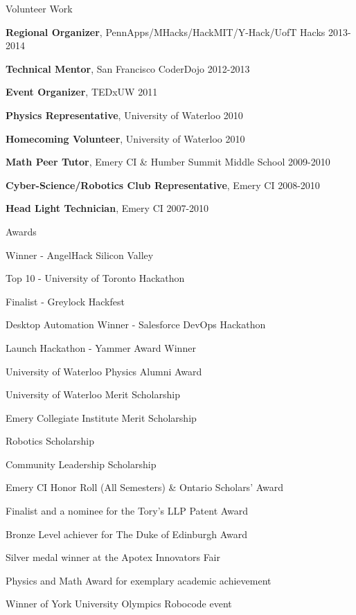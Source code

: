 \documentclass[oneside]{resume}
\begin{document}
  \begin{rSection}{Volunteer Work}

    \begin{rSubListing}
      \item {{\bfseries Regional Organizer}, PennApps/MHacks/HackMIT/Y-Hack/UofT Hacks \hfill 2013-2014}
      \item {{\bfseries Technical Mentor}, San Francisco CoderDojo \hfill 2012-2013}
      \item {{\bfseries Event Organizer}, TEDxUW \hfill 2011}
      \item {{\bfseries Physics Representative}, University of Waterloo \hfill 2010}
      \item {{\bfseries Homecoming Volunteer}, University of Waterloo \hfill 2010}
      \item {{\bfseries Math Peer Tutor}, Emery CI \& Humber Summit Middle School \hfill 2009-2010}
      \item {{\bfseries Cyber-Science/Robotics Club Representative}, Emery CI \hfill 2008-2010}
      \item {{\bfseries Head Light Technician}, Emery CI \hfill 2007-2010}
    \end{rSubListing}

  \end{rSection}


  \begin{rSection}{Awards}

    \begin{rSubListing}
      \item Winner - AngelHack Silicon Valley
      \item Top 10 - University of Toronto Hackathon
      \item Finalist - Greylock Hackfest
      \item Desktop Automation Winner - Salesforce DevOps Hackathon
      \item Launch Hackathon - Yammer Award Winner
      \item University of Waterloo Physics Alumni Award
      \item University of Waterloo Merit Scholarship
      \item Emery Collegiate Institute Merit Scholarship
      \item Robotics Scholarship
      \item Community Leadership Scholarship
      \item Emery CI Honor Roll (All Semesters) \& Ontario Scholars’ Award
      \item Finalist and a nominee for the Tory’s LLP Patent Award
      \item Bronze Level achiever for The Duke of Edinburgh Award
      \item Silver medal winner at the Apotex Innovators Fair
      \item Physics and Math Award for exemplary academic achievement
      \item Winner of York University Olympics Robocode event
    \end{rSubListing}

  \end{rSection}
\end{document}
